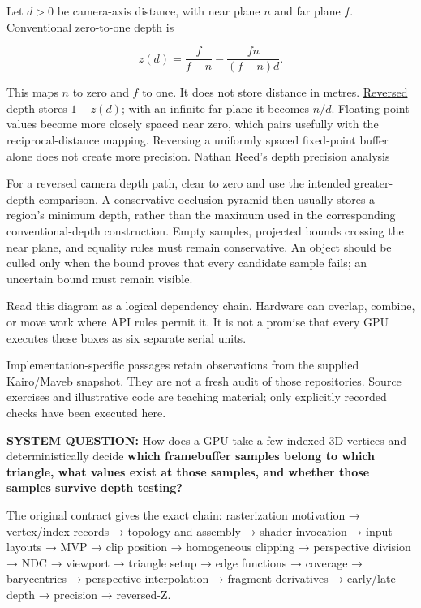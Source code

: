 Let \(d>0\) be camera-axis distance, with near plane \(n\) and far plane \(f\). Conventional zero-to-one depth is

\[
z(d)=\frac{f}{f-n}-\frac{fn}{(f-n)d}.
\]

This maps \(n\) to zero and \(f\) to one. It does not store distance in metres. \hyperref[appendix-275ec8847057]{Reversed depth} stores \(1-z(d)\); with an infinite far plane it becomes \(n/d\). Floating-point values become more closely spaced near zero, which pairs usefully with the reciprocal-distance mapping. Reversing a uniformly spaced fixed-point buffer alone does not create more precision. \href{https://developer.nvidia.com/blog/visualizing-depth-precision/}{Nathan Reed's depth precision analysis}

For a reversed camera depth path, clear to zero and use the intended greater-depth comparison. A conservative occlusion pyramid then usually stores a region's minimum depth, rather than the maximum used in the corresponding conventional-depth construction. Empty samples, projected bounds crossing the near plane, and equality rules must remain conservative. An object should be culled only when the bound proves that every candidate sample fails; an uncertain bound must remain visible.


Read this diagram as a logical dependency chain. Hardware can overlap, combine, or move work where API rules permit it. It is not a promise that every GPU executes these boxes as six separate serial units.

Implementation-specific passages retain observations from the supplied Kairo/Maveb snapshot. They are not a fresh audit of those repositories. Source exercises and illustrative code are teaching material; only explicitly recorded checks have been executed here.

\textbf{SYSTEM QUESTION:} How does a GPU take a few indexed 3D vertices and deterministically decide \textbf{which framebuffer samples belong to which triangle, what values exist at those samples, and whether those samples survive depth testing?}

The original contract gives the exact chain: rasterization motivation → vertex/index records → topology and assembly → shader invocation → input layouts → MVP → clip position → homogeneous clipping → perspective division → NDC → viewport → triangle setup → edge functions → coverage → barycentrics → perspective interpolation → fragment derivatives → early/late depth → precision → reversed-Z.

